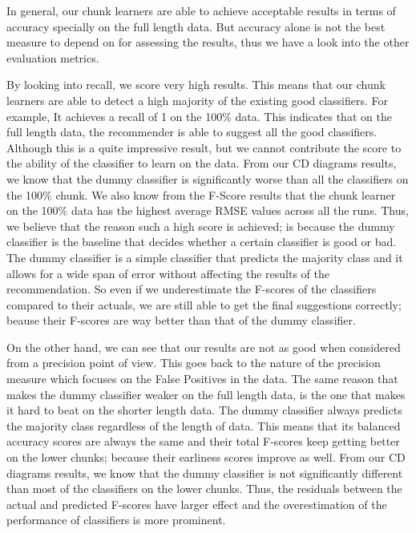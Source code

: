 In general, our chunk learners are able to achieve acceptable results in terms of accuracy specially on the full length data.
But accuracy alone is not the best measure to depend on for assessing the results, thus we have a look into the other evaluation metrics.

By looking into recall, we score very high results. This means that our chunk learners are able to detect a high majority of the existing good classifiers.
For example, It achieves a recall of 1 on the 100\% data. This indicates that on the full length data, the recommender is able to suggest all the good classifiers.
Although this is a quite impressive result, but we cannot contribute the score to the ability of the classifier to learn on the data.
From our CD diagrams results, we know that the dummy classifier is significantly worse than all the classifiers on the 100\% chunk.
We also know from the F-Score results that the chunk learner on the 100\% data has the highest average RMSE values across all the runs. 
Thus, we believe that the reason such a high score is achieved; is because the dummy classifier is the baseline that decides whether a certain classifier is good or bad.
The dummy classifier is a simple classifier that predicts the majority class and it allows for a wide span of error without affecting the results of the recommendation.
So even if we underestimate the F-scores of the classifiers compared to their actuals, we are still able to get the final suggestions correctly; beause their F-scores are way better than that of the dummy classifier.

On the other hand, we can see that our results are not as good when considered from a precision point of view.
This goes back to the nature of the precision measure which focuses on the False Positives in the data.
The same reason that makes the dummy classifier weaker on the full length data, is the one that makes it hard to beat on the shorter length data.
The dummy classifier always predicts the majority class regardless of the length of data.
This means that its balanced accuracy scores are always the same and their total F-scores keep getting better on the lower chunks; because their earliness scores improve as well.
From our CD diagrams results, we know that the dummy classifier is not significantly different than most of the classifiers on the lower chunks.
Thus, the residuals between the actual and predicted F-scores have larger effect and the overestimation of the performance of classifiers is more prominent.

